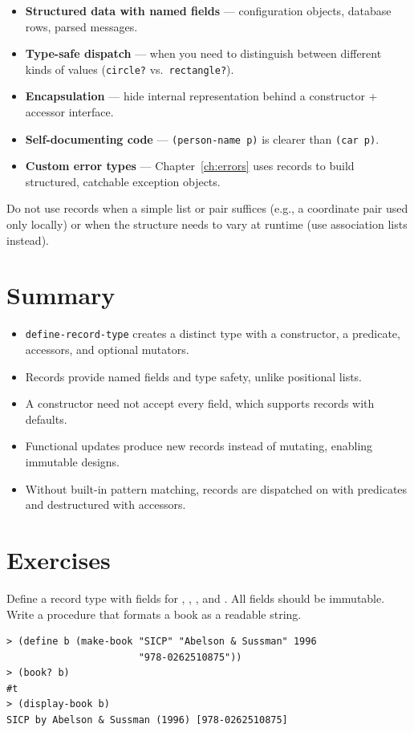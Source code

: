 \begin{itemize}
    \item \textbf{Structured data with named fields} --- configuration objects, database rows, parsed messages.
    \item \textbf{Type-safe dispatch} --- when you need to distinguish between different kinds of values (\texttt{circle?} vs.\ \texttt{rectangle?}).
    \item \textbf{Encapsulation} --- hide internal representation behind a constructor + accessor interface.
    \item \textbf{Self-documenting code} --- \texttt{(person-name p)} is clearer than \texttt{(car p)}.
    \item \textbf{Custom error types} --- Chapter~\ref{ch:errors} uses records to build structured, catchable exception objects.
\end{itemize}

Do not use records when a simple list or pair suffices (e.g., a coordinate pair used only locally) or when the structure needs to vary at runtime (use association lists instead).

\section*{Summary}

\begin{itemize}
    \item \texttt{define-record-type} creates a distinct type with a constructor, a predicate, accessors, and optional mutators.
    \item Records provide named fields and type safety, unlike positional lists.
    \item A constructor need not accept every field, which supports records with defaults.
    \item Functional updates produce new records instead of mutating, enabling immutable designs.
    \item Without built-in pattern matching, records are dispatched on with predicates and destructured with accessors.
\end{itemize}

\section*{Exercises}

\begin{exercise}
Define a  record type with fields for , , , and . All fields should be immutable. Write a  procedure that formats a book as a readable string.

\begin{lstlisting}[style=repl]
> (define b (make-book "SICP" "Abelson & Sussman" 1996
                       "978-0262510875"))
> (book? b)
#t
> (display-book b)
SICP by Abelson & Sussman (1996) [978-0262510875]
\end{lstlisting}
\end{exercise}


